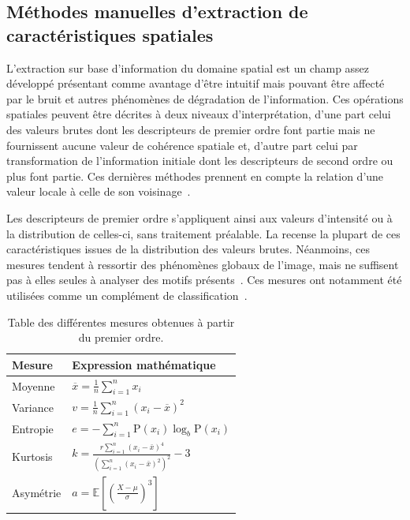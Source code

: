 \subsection{Méthodes manuelles d'extraction de caractéristiques spatiales}
L'extraction sur base d'information du domaine spatial est un champ assez développé présentant comme avantage d'être intuitif mais pouvant être affecté par le bruit et autres phénomènes de dégradation de l'information. Ces opérations spatiales peuvent être décrites à deux niveaux d'interprétation, d'une part celui des valeurs brutes dont les descripteurs de premier ordre font partie mais ne fournissent aucune valeur de cohérence spatiale et, d'autre part celui par transformation de l'information initiale dont les descripteurs de second ordre ou plus font partie. Ces dernières méthodes prennent en compte la relation d'une valeur locale à celle de son voisinage~\cite{Kamila2015}.\par

Les descripteurs de premier ordre s'appliquent ainsi aux valeurs d'intensité ou à la distribution de celles-ci, sans traitement préalable. La  recense la plupart de ces caractéristiques issues de la distribution des valeurs brutes. Néanmoins, ces mesures tendent à ressortir des phénomènes globaux de l'image, mais ne suffisent pas à elles seules à analyser des motifs présents~\cite{Tomita1990, Srinivasan2008, Uyun2013, NyeinNyeinHlaing2015}. Ces mesures ont notamment été utilisées comme un complément de classification~\cite{Wiltgen2008}.\par

\begin{table}[H]
    \centering
    \begin{tabular}{ll}
        \toprule
        \textbf{Mesure}             & \textbf{Expression mathématique}                                                  \\ \hline
        Moyenne                     & $\overline{x} = \frac{1}{n}\sum_{i=1}^n x_i$                                      \\   
        Variance                    & $v = \frac{1}{n}\sum_{i=1}^n \left(x_i - \overline{x}\right)^2$                   \\ 
        Entropie                    & $e = -\sum_{i=1}^n {\mathrm{P}(x_i) \log_b \mathrm{P}(x_i)}$                      \\
        Kurtosis                    & $k=\frac{r \sum_{i=1}^{n}\left(x_{i}-\bar{x}\right)^{4}}{\left(\sum_{i=1}^{n}\left(x_{i}-\bar{x}\right)^{2}\right)^{2}}-3$\\
        Asymétrie                   & $a = \mathbb{E} \left[ \left( \frac{X - \mu}{\sigma} \right)^3 \right]$           \\  
        \bottomrule
    \end{tabular}
    \caption{Table des différentes mesures obtenues à partir du premier ordre.}
    \label{tab:first_order_descriptors}
\end{table}\par

